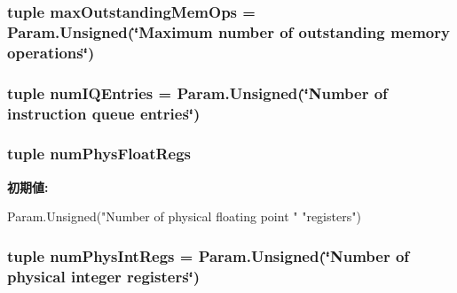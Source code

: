 \label{classOzoneCPU_1_1DerivOzoneCPU_a7bef7a8f745bad1c4151dadaef30c4f7}
\hypertarget{classOzoneCPU_1_1DerivOzoneCPU_a1594a4cde9fee64055e5ce9a3cd28e6a}{
\subsubsection[{maxOutstandingMemOps}]{\setlength{\rightskip}{0pt plus 5cm}tuple {\bf maxOutstandingMemOps} = Param.Unsigned(\char`\"{}Maximum number of outstanding memory operations\char`\"{})}}
\label{classOzoneCPU_1_1DerivOzoneCPU_a1594a4cde9fee64055e5ce9a3cd28e6a}
\hypertarget{classOzoneCPU_1_1DerivOzoneCPU_a008b4cba2a3f283c5889144437338721}{
\subsubsection[{numIQEntries}]{\setlength{\rightskip}{0pt plus 5cm}tuple {\bf numIQEntries} = Param.Unsigned(\char`\"{}Number of instruction queue entries\char`\"{})}}
\label{classOzoneCPU_1_1DerivOzoneCPU_a008b4cba2a3f283c5889144437338721}
\hypertarget{classOzoneCPU_1_1DerivOzoneCPU_aa014e3ffbc9e5c2cdee9cd256bcb9a94}{
\subsubsection[{numPhysFloatRegs}]{\setlength{\rightskip}{0pt plus 5cm}tuple {\bf numPhysFloatRegs}}}
\label{classOzoneCPU_1_1DerivOzoneCPU_aa014e3ffbc9e5c2cdee9cd256bcb9a94}
{\bfseries 初期値:}
\begin{DoxyCode}
Param.Unsigned("Number of physical floating point "
               "registers")
\end{DoxyCode}
\hypertarget{classOzoneCPU_1_1DerivOzoneCPU_a4872233fcf1f251c1065c07bf3d288b4}{
\subsubsection[{numPhysIntRegs}]{\setlength{\rightskip}{0pt plus 5cm}tuple {\bf numPhysIntRegs} = Param.Unsigned(\char`\"{}Number of physical integer registers\char`\"{})}}
